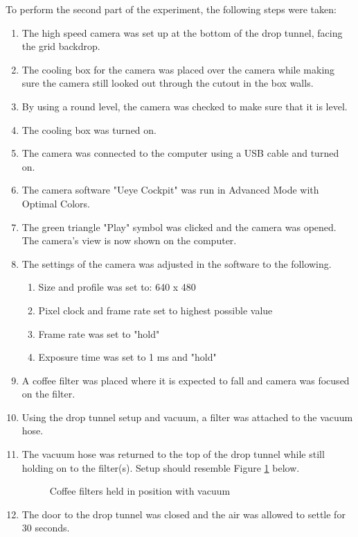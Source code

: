 \documentclass[12pt]{report}
\begin{document}
\noindent To perform the second part of the experiment, the following steps were taken:

\begin{enumerate}
	\item The high speed camera was set up at the bottom of the drop tunnel, facing the grid backdrop.
	\item The cooling box for the camera was placed over the camera while making sure the camera still looked out through the cutout in the box walls.
	\item By using a round level, the camera was checked to make sure that it is level.
	\item The cooling box was turned on.
	\item The camera was connected to the computer using a USB cable and turned on.
	\item The camera software "Ueye Cockpit" was run in Advanced Mode with Optimal Colors.
	\item The green triangle "Play" symbol was clicked and the camera was opened. The camera's view is now shown on the computer. 
	\item The settings of the camera was adjusted in the software to the following.
	\begin{enumerate}
		\item Size and profile was set to: 640 x 480
		\item Pixel clock and frame rate set to highest possible value
		\item Frame rate was set to "hold"
		\item Exposure time was set to 1 ms and "hold"
	\end{enumerate}
	\item A coffee filter was placed where it is expected to fall and camera was focused on the filter.
	\item Using the drop tunnel setup and vacuum, a filter was attached to the vacuum hose.
	\item The vacuum hose was returned to the top of the drop tunnel while still holding on to the filter(s). Setup should resemble Figure \ref{fig:vacuumfilter} below.
	\begin{figure}[h!]
		\centering
		\caption{Coffee filters held in position with vacuum}
		\label{fig:vacuumfilter}
	\end{figure}
	\item The door to the drop tunnel was closed and the air was allowed to settle for 30 seconds.

\end{enumerate}
\end{document}
